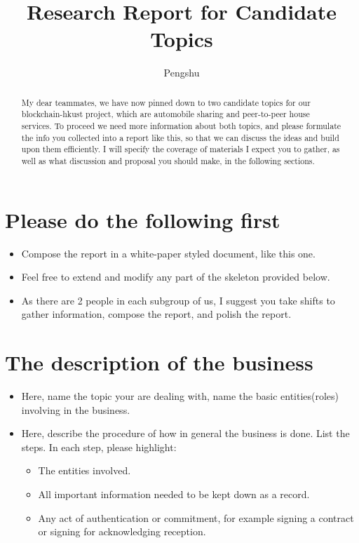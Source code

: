 \documentclass[]{scrartcl}
\title{Research Report for Candidate Topics}
\author{Pengshu}
\begin{document}
\maketitle

\begin{abstract}
My dear teammates, we have now pinned down to two candidate topics for our blockchain-hkust project, which are automobile sharing and peer-to-peer house services. To proceed we need more information about both topics, and please formulate the info you collected into a report like this, so that we can discuss the ideas and build upon them efficiently. I will specify the coverage of materials I expect you to gather, as well as what discussion and proposal you should make, in the following sections.
\end{abstract}

\section{Please do the following first}
\begin{itemize}
\item Compose the report in a white-paper styled document, like this one.
\item Feel free to extend and modify any part of the skeleton provided below. 
\item As there are 2 people in each subgroup of us, I suggest you take shifts to gather information, compose the report, and polish the report.
\end{itemize}


\section{The description of the business}
\begin{itemize}
\item Here, name the topic your are dealing with, name the basic entities(roles) involving in the business.
\item Here, describe the procedure of how in general the business is done. List the steps. In each step, please highlight: \begin{itemize}
	\item The entities involved.
	\item All important information needed to be kept down as a record.
	\item Any act of authentication or commitment, for example signing a contract or signing for acknowledging reception. 
\end{itemize} 	
\end{itemize}
\end{document}
